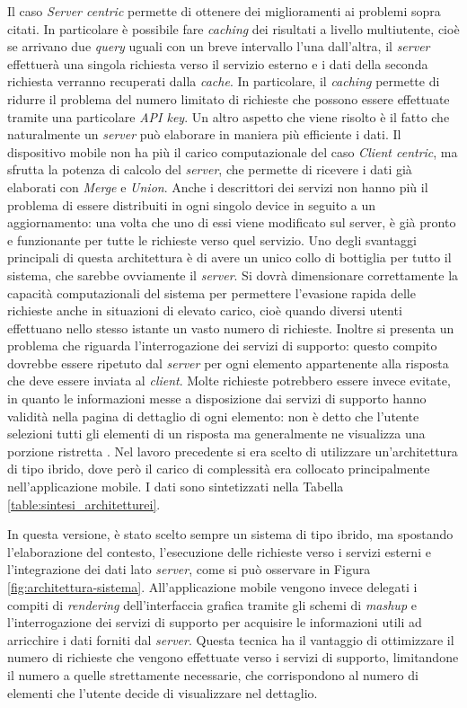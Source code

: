 Il caso \emph{Server centric} permette di ottenere dei miglioramenti ai problemi sopra citati. In particolare è possibile fare \emph{caching} dei risultati a livello multiutente, cioè se arrivano due \emph{query} uguali con un breve intervallo l'una dall'altra, il \emph{server} effettuerà una singola richiesta verso il servizio esterno e i dati della seconda richiesta verranno recuperati dalla \emph{cache}. In particolare, il \emph{caching} permette di ridurre il problema del numero limitato di richieste che possono essere effettuate tramite una particolare \emph{API key}. Un altro aspetto che viene risolto è il fatto che naturalmente un \emph{server} può elaborare in maniera più efficiente i dati. Il dispositivo mobile non ha più il carico computazionale del caso \emph{Client centric}, ma sfrutta la potenza di calcolo del \emph{server}, che permette di ricevere i dati già elaborati con \emph{Merge} e \emph{Union}. Anche i descrittori dei servizi non hanno più il problema di essere distribuiti in ogni singolo device in seguito a un aggiornamento: una volta che uno di essi viene modificato sul server, è già pronto e funzionante per tutte le richieste verso quel servizio.
Uno degli svantaggi principali di questa architettura è di avere un unico collo di bottiglia per tutto il sistema, che sarebbe ovviamente il \emph{server}. Si dovrà dimensionare correttamente la capacità computazionali del sistema per permettere l'evasione rapida delle richieste anche in situazioni di elevato carico, cioè quando diversi utenti effettuano nello stesso istante un vasto numero di richieste. Inoltre si presenta un problema che riguarda l'interrogazione dei servizi di supporto: questo compito dovrebbe essere ripetuto dal \emph{server} per ogni elemento appartenente alla risposta che deve essere inviata al \emph{client}. Molte richieste potrebbero essere invece evitate, in quanto le informazioni messe a disposizione dai servizi di supporto hanno validità nella pagina di dettaglio di ogni elemento: non è detto che l'utente selezioni tutti gli elementi di un risposta ma generalmente ne visualizza una porzione ristretta \cite{van2009using}. Nel lavoro precedente \cite{rizzo2015progettazione} si era scelto di utilizzare un'architettura di tipo ibrido, dove però il carico di complessità era collocato principalmente nell'applicazione mobile.
I dati sono sintetizzati nella Tabella \ref{table:sintesi_architetturei}.

In questa versione, è stato scelto sempre un sistema di tipo ibrido, ma spostando l'elaborazione del contesto, l'esecuzione delle richieste verso i servizi esterni e l'integrazione dei dati lato \emph{server}, come si può osservare in Figura \ref{fig:architettura-sistema}. All'ap\-pli\-ca\-zio\-ne mobile vengono invece delegati i compiti di \emph{rendering} dell'interfaccia grafica tramite gli schemi di \emph{mashup} e l'interrogazione dei servizi di supporto per acquisire le informazioni utili ad arricchire i dati forniti dal \emph{server}. Questa tecnica ha il vantaggio di ottimizzare il numero di richieste che vengono effettuate verso i servizi di supporto, limitandone il numero a quelle strettamente necessarie, che corrispondono al numero di elementi che l'utente decide di visualizzare nel dettaglio.

